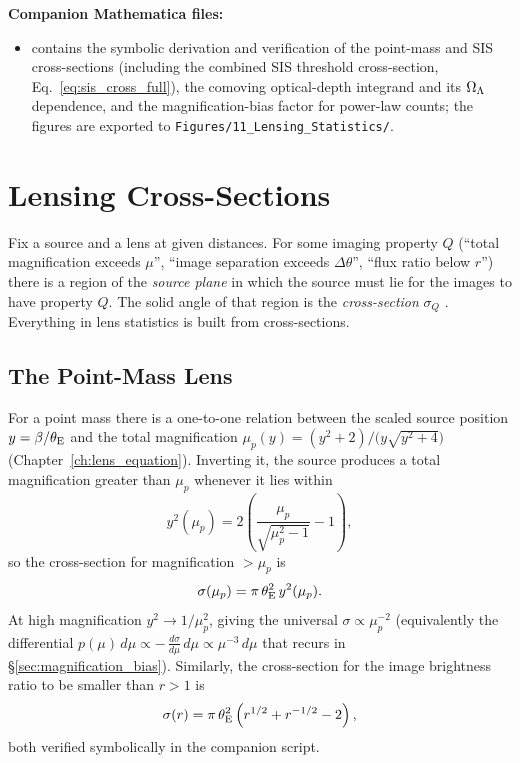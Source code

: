 \medskip
\noindent
\textbf{Companion Mathematica files:}
\begin{itemize}[nosep]
    \item {}
          contains the symbolic derivation and verification of the
          point-mass and SIS cross-sections (including the combined
          SIS threshold cross-section, Eq.~\eqref{eq:sis_cross_full}),
          the comoving optical-depth integrand and its $\Omega_{\Lambda}$
          dependence, and the magnification-bias factor for power-law
          counts; the figures are exported to
          \texttt{Figures/11\_Lensing\_Statistics/}.
\end{itemize}


\section{Lensing Cross-Sections}
\label{sec:cross_sections}

Fix a source and a lens at given distances.  For some imaging property
$Q$ (``total magnification exceeds $\mu$'', ``image separation exceeds
$\Delta\theta$'', ``flux ratio below $r$'') there is a region of the
\emph{source plane} in which the source must lie for the images to have
property $Q$.  The solid angle of that region is the \emph{cross-section}
$\sigma_Q$
\citep[][Part~1, \S5.1]{schneider_kochanek_wambsganss_2006}.  Everything
in lens statistics is built from cross-sections.

\subsection{The Point-Mass Lens}
\label{sec:cross_point}

For a point mass there is a one-to-one relation between the scaled source
position $y = \beta/\theta_{\mathrm{E}}$ and the total magnification
$\mu_p(y) = (y^2+2)/\big(y\sqrt{y^2+4}\big)$
(Chapter~\ref{ch:lens_equation}).  Inverting it, the source produces a
total magnification greater than $\mu_p$ whenever it lies within
\begin{equation}
    y^2(\mu_p)
    = 2\left(\frac{\mu_p}{\sqrt{\mu_p^2-1}} - 1\right),
    \label{eq:point_ymu}
\end{equation}
so the cross-section for magnification $>\mu_p$ is
\begin{equation}
    \sigma(\mu_p) = \pi\,\theta_{\mathrm{E}}^2\,y^2(\mu_p).
    \label{eq:point_cross_mu}
\end{equation}
At high magnification $y^2 \to 1/\mu_p^2$, giving the universal
$\sigma \propto \mu_p^{-2}$ (equivalently the differential
$p(\mu)\,d\mu \propto -\,\tfrac{d\sigma}{d\mu}\,d\mu \propto \mu^{-3}\,d\mu$
that recurs in \S\ref{sec:magnification_bias}).  Similarly, the cross-section for the
image brightness ratio to be smaller than $r > 1$ is
\begin{equation}
    \sigma(r) = \pi\,\theta_{\mathrm{E}}^2\left(r^{1/2} + r^{-1/2} - 2\right),
    \label{eq:point_cross_r}
\end{equation}
both verified symbolically in the companion script.

